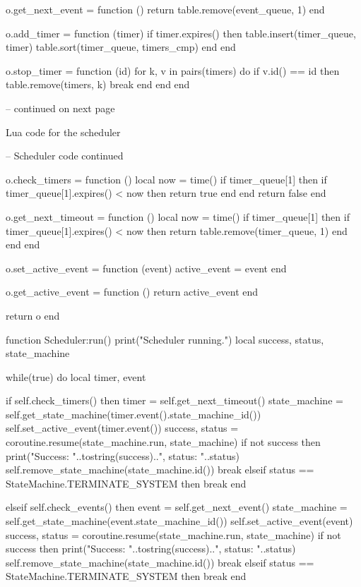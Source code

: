 \begin{appendices}
\begin{listing}[H]
\begin{luacode}
	o.get_next_event = function ()
		return table.remove(event_queue, 1)
	end

	o.add_timer = function (timer)
		if timer.expires() then
			table.insert(timer_queue, timer)
			table.sort(timer_queue, timers_cmp)
		end
	end

	o.stop_timer = function (id)
		for k, v in pairs(timers) do
			if v.id() == id then
				table.remove(timers, k)
				break
			end
		end
	end

-- continued on next page
\end{luacode}
	\caption{Lua code for the scheduler}
	\label{code:scheduler}
\end{listing}

\begin{listing}[H]
\begin{luacode}
-- Scheduler code continued

	o.check_timers = function ()
		local now = time()
		if timer_queue[1] then
			if timer_queue[1].expires() < now then return true end
		end
		return false
	end

	o.get_next_timeout = function ()
		local now = time()
		if timer_queue[1] then
			if timer_queue[1].expires() < now then return table.remove(timer_queue, 1) end
		end
	end

	o.set_active_event = function (event)
		active_event = event
	end

	o.get_active_event = function ()
		return active_event
	end

	return o
end

function Scheduler:run()
	print("Scheduler running.")
	local success, status, state_machine

	while(true) do	
		local timer, event
		
		if self.check_timers() then
			timer = self.get_next_timeout()
			state_machine = self.get_state_machine(timer.event().state_machine_id())
			self.set_active_event(timer.event())
			success, status = coroutine.resume(state_machine.run, state_machine)
			if not success then
				print("Success: "..tostring(success)..", status: "..status)
				self.remove_state_machine(state_machine.id())
				break
			elseif status == StateMachine.TERMINATE_SYSTEM then
				break
			end

		elseif self.check_events() then
			event = self.get_next_event()
			state_machine = self.get_state_machine(event.state_machine_id())
			self.set_active_event(event)
			success, status = coroutine.resume(state_machine.run, state_machine)
			if not success then
				print("Success: "..tostring(success)..", status: "..status)
				self.remove_state_machine(state_machine.id())
				break
			elseif status == StateMachine.TERMINATE_SYSTEM then
				break
			end


\end{luacode}
\end{listing}
\end{appendices}
